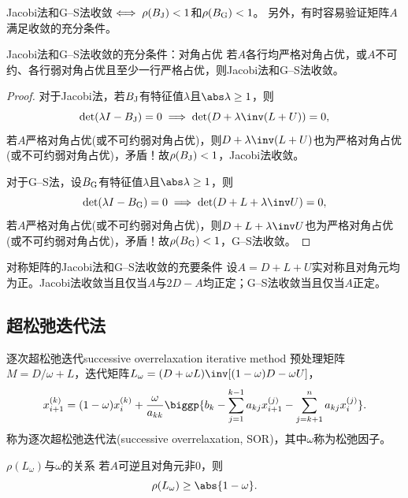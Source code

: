 \begin{remark}
    Jacobi法和G--S法收敛$\iff\rho(B_\text J)<1$和$\rho(B_\text G)<1$。
    另外，有时容易验证矩阵$A$满足收敛的充分条件。
\end{remark}

\begin{theorem}
    {Jacobi法和G--S法收敛的充分条件：对角占优}{}
    若$A$各行均严格对角占优，或$A$不可约、各行弱对角占优且至少一行严格占优，则Jacobi法和G--S法收敛。
\end{theorem}

\begin{proof}
    对于Jacobi法，若$B_\text J$有特征值$\lambda$且$\abs\lambda\geq 1$，则 
    \[
        \det(\lambda I-B_\text J)=0\implies\det(D+\lambda\inv(L+U))=0,
    \]
    若$A$严格对角占优(或不可约弱对角占优)，则$D+\lambda\inv(L+U)$也为严格对角占优(或不可约弱对角占优)，矛盾！故$\rho(B_\text J)<1$，Jacobi法收敛。

    对于G--S法，设$B_\text G$有特征值$\lambda$且$\abs\lambda\geq 1$，则
    \[
        \det(\lambda I-B_\text G)=0\implies\det(D+L+\lambda\inv U)=0,
    \]
    若$A$严格对角占优(或不可约弱对角占优)，则$D+L+\lambda\inv U$也为严格对角占优(或不可约弱对角占优)，矛盾！故$\rho(B_\text G)<1$，G--S法收敛。
\end{proof}

\begin{theorem}
    {对称矩阵的Jacobi法和G--S法收敛的充要条件}{}
    设$A=D+L+U$实对称且对角元均为正。Jacobi法收敛当且仅当$A$与$2D-A$均正定；G--S法收敛当且仅当$A$正定。
\end{theorem}

\subsection{超松弛迭代法}

\begin{example}
    {逐次超松弛迭代}{successive overrelaxation iterative method}
    预处理矩阵$M=D/\omega+L$，迭代矩阵$L_\omega=(D+\omega L)\inv[(1-\omega)D-\omega U]$，
    \begin{equation}
        x_{i+1}^{(k)}=(1-\omega)x_i^{(k)}+\frac\omega{a_{kk}}\biggp{b_k-\sum_{j=1}^{k-1}a_{kj}x_{i+1}^{(j)}-\sum_{j=k+1}^na_{kj}x_i^{(j)}}.
    \end{equation}
    称为逐次超松弛迭代法(successive overrelaxation, SOR)，其中$\omega$称为松弛因子。
\end{example}

\begin{theorem}
    {$\rho(L_\omega)$与$\omega$的关系}{}
    若$A$可逆且对角元非0，则
    \begin{equation}
        \rho(L_\omega)\geq\abs{1-\omega}.
    \end{equation}
\end{theorem}

